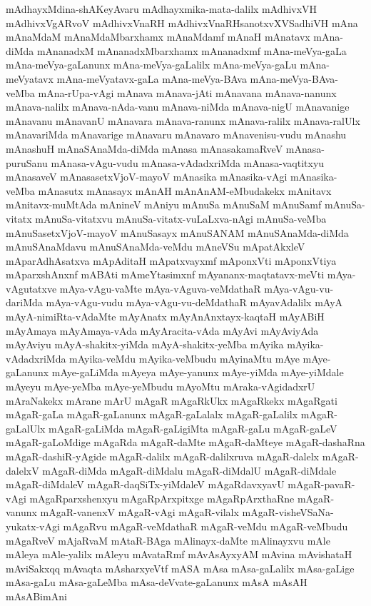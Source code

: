 {mAdhayxMdina-shAKeyAvaru
mAdhayxmika-mata-dalilx
mAdhivxVH
mAdhivxVgARvoV
mAdhivxVnaRH
mAdhivxVnaRHsanotxvXVSadhiVH
mAna
mAnaMdaM
mAnaMdaMbarxhamx
mAnaMdamf
mAnaH
mAnatavx
mAna-diMda
mAnanadxM
mAnanadxMbarxhamx
mAnanadxmf
mAna-meVya-gaLa
mAna-meVya-gaLanunx
mAna-meVya-gaLalilx
mAna-meVya-gaLu
mAna-meVyatavx
mAna-meVyatavx-gaLa
mAna-meVya-BAva
mAna-meVya-BAva-veMba
mAna-rUpa-vAgi
mAnava
mAnava-jAti
mAnavana
mAnava-nanunx
mAnava-nalilx
mAnava-nAda-vanu
mAnava-niMda
mAnava-nigU
mAnavanige
mAnavanu
mAnavanU
mAnavara
mAnava-ranunx
mAnava-ralilx
mAnava-ralUlx
mAnavariMda
mAnavarige
mAnavaru
mAnavaro
mAnavenisu-vudu
mAnashu
mAnashuH
mAnaSAnaMda-diMda
mAnasa
mAnasakamaRveV
mAnasa-puruSanu
mAnasa-vAgu-vudu
mAnasa-vAdadxriMda
mAnasa-vaqtitxyu
mAnasaveV
mAnasasetxVjoV-mayoV
mAnasika
mAnasika-vAgi
mAnasika-veMba
mAnasutx
mAnasayx
mAnAH
mAnAnAM-eMbudakekx
mAnitavx
mAnitavx-muMtAda
mAnineV
mAniyu
mAnuSa
mAnuSaM
mAnuSamf
mAnuSa-vitatx
mAnuSa-vitatxvu
mAnuSa-vitatx-vuLaLxva-nAgi
mAnuSa-veMba
mAnuSasetxVjoV-mayoV
mAnuSasayx
mAnuSANAM
mAnuSAnaMda-diMda
mAnuSAnaMdavu
mAnuSAnaMda-veMdu
mAneVSu
mApatAkxleV
mAparAdhAsatxva
mApAditaH
mApatxvayxmf
mAponxVti
mAponxVtiya
mAparxshAnxnf
mABAti
mAmeYtasimxnf
mAyananx-maqtatavx-meVti
mAya-vAgutatxve
mAya-vAgu-vaMte
mAya-vAguva-veMdathaR
mAya-vAgu-vu-dariMda
mAya-vAgu-vudu
mAya-vAgu-vu-deMdathaR
mAyavAdalilx
mAyA
mAyA-nimiRta-vAdaMte
mAyAnatx
mAyAnAnxtayx-kaqtaH
mAyABiH
mAyAmaya
mAyAmaya-vAda
mAyAracita-vAda
mAyAvi
mAyAviyAda
mAyAviyu
mAyA-shakitx-yiMda
mAyA-shakitx-yeMba
mAyika
mAyika-vAdadxriMda
mAyika-veMdu
mAyika-veMbudu
mAyinaMtu
mAye
mAye-gaLanunx
mAye-gaLiMda
mAyeya
mAye-yanunx
mAye-yiMda
mAye-yiMdale
mAyeyu
mAye-yeMba
mAye-yeMbudu
mAyoMtu
mAraka-vAgidadxrU
mAraNakekx
mArane
mArU
mAgaR
mAgaRkUkx
mAgaRkekx
mAgaRgati
mAgaR-gaLa
mAgaR-gaLanunx
mAgaR-gaLalalx
mAgaR-gaLalilx
mAgaR-gaLalUlx
mAgaR-gaLiMda
mAgaR-gaLigiMta
mAgaR-gaLu
mAgaR-gaLeV
mAgaR-gaLoMdige
mAgaRda
mAgaR-daMte
mAgaR-daMteye
mAgaR-dashaRna
mAgaR-dashiR-yAgide
mAgaR-dalilx
mAgaR-dalilxruva
mAgaR-dalelx
mAgaR-dalelxV
mAgaR-diMda
mAgaR-diMdalu
mAgaR-diMdalU
mAgaR-diMdale
mAgaR-diMdaleV
mAgaR-daqSiTx-yiMdaleV
mAgaRdavxyavU
mAgaR-pavaR-vAgi
mAgaRparxshenxyu
mAgaRpArxpitxge
mAgaRpArxthaRne
mAgaR-vanunx
mAgaR-vanenxV
mAgaR-vAgi
mAgaR-vilalx
mAgaR-visheVSaNa-yukatx-vAgi
mAgaRvu
mAgaR-veMdathaR
mAgaR-veMdu
mAgaR-veMbudu
mAgaRveV
mAjaRvaM
mAtaR-BAga
mAlinayx-daMte
mAlinayxvu
mAle
mAleya
mAle-yalilx
mAleyu
mAvataRmf
mAvAsAyxyAM
mAvina
mAvishataH
mAviSakxqq
mAvaqta
mAsharxyeVtf
mASA
mAsa
mAsa-gaLalilx
mAsa-gaLige
mAsa-gaLu
mAsa-gaLeMba
mAsa-deVvate-gaLanunx
mAsA
mAsAH
mAsABimAni
}
